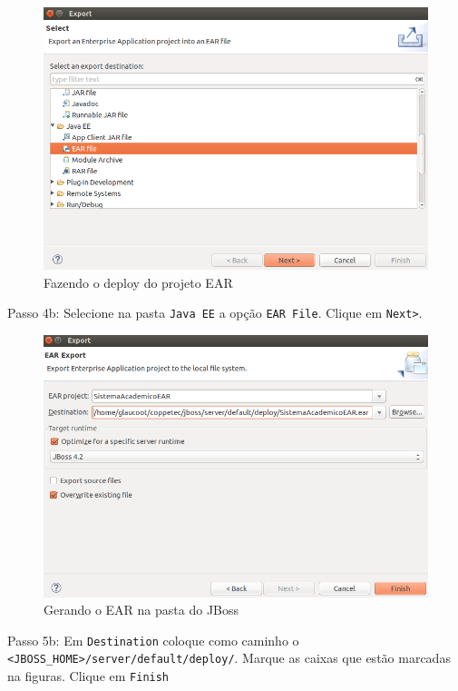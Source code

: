 \begin{figure}[H]
	\centering
	\includegraphics[scale=0.5]{files/imgs/gwt-14.png}
	\caption{Fazendo o deploy do projeto EAR}
	\label{gwt14}
\end{figure}

Passo 4b: Selecione na pasta \texttt{Java EE} a opção \texttt{EAR File}. Clique em \texttt{Next>}.

\begin{figure}[H]
	\centering
	\includegraphics[scale=0.5]{files/imgs/gwt-15.png}
	\caption{Gerando o EAR na pasta do JBoss}
	\label{gwt15}
\end{figure}

Passo 5b: Em \texttt{Destination} coloque como caminho o \texttt{<JBOSS\_HOME>/server/default/deploy/}. Marque as caixas que estão
marcadas na figuras. Clique em \texttt{Finish}

